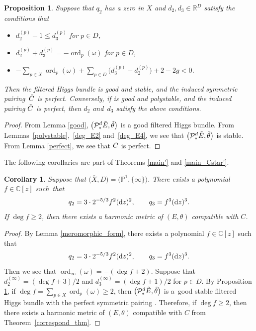 \documentclass[pdftex]{sigma}
\numberwithin{equation}{section}
\newtheorem{Corollary}[Theorem]{Corollary}
\newtheorem{Proposition}[Theorem]{Proposition}
 { \theoremstyle{definition}
\newtheorem{Definition}[Theorem]{Definition}
\newtheorem{Note}[Theorem]{Note}
\newtheorem{Example}[Theorem]{Example}
\newtheorem{Remark}[Theorem]{Remark}

\newtheorem{Question}[Theorem]{Question}
\newtheorem{Assumption}[Theorem]{Assumption}}
\newcommand{\C}{\mathbb{C}}
\newcommand{\R}{\mathbb{R}}
\newcommand{\ps}{\mathbb{P}}
\newcommand{\ord}{\operatorname{ord}}
\begin{document}
\begin{Proposition}\label{main_prop}
 Suppose that $q_2$ has a zero in $X$ and $d_2, d_3\in \R^D$ satisfy the conditions that
 \begin{itemize}\itemsep=0pt
 \item $d^{(p)}_2-1\leq d^{(p)}_3$ for $p\in D$,
 \item $d^{(p)}_2 + d^{(p)}_3 = -\ord_p(\omega)$ for $p\in D$,
 \item $-\sum_{p\in X}\ord_p(\omega) + \sum_{p\in D} \bigl(d^{(p)}_3 - d^{(p)}_2\bigr) + 2-2g <0$.
 \end{itemize}
 Then the filtered Higgs bundle  is good and stable, and the induced symmetric pairing~$\Tilde{C}$ is perfect. Conversely, if  is good and polystable, and the induced pairing $\Tilde{C}$ is perfect, then $d_2$ and~$d_3$ satisfy the above conditions.
\end{Proposition}
\begin{proof}
 From Lemma \ref{good}, $\bigl(\mathcal{P}^d_{*}{\Tilde{E}},\Tilde{\theta}\bigr)$ is a good filtered Higgs bundle.
 From Lemmas~\ref{polystable},~\ref{deg_E2} and~\ref{deg_E4}, we see that $\bigl(\mathcal{P}^d_{*}{\Tilde{E}},\Tilde{\theta}\bigr)$ is stable. From Lemma \ref{perfect}, we see that $\Tilde{C}$ is perfect.
\end{proof}

The following corollaries are part of Theorems \ref{main'} and \ref{main_Cstar'}.
\begin{Corollary}\label{main_cor}
 Suppose that $\bigl(\overline{X},D\bigr)=\bigl(\ps^1,\{\infty\}\bigr)$. There exists a polynomial $f\in \C[z]$ such~that
 \begin{equation*}
 q_2 = 3\cdot 2^{-5/3}f^2 ({\rm d}z)^2, \qquad q_3 = f^3 ({\rm d}z)^3.
 \end{equation*}
 If $\deg{f}\geq 2$, then there exists a harmonic metric of $(E,\theta)$ compatible with $C$.
\end{Corollary}
\begin{proof}
 By Lemma \ref{meromorphic_form}, there exists a polynomial $f\in \C[z]$ such that
 \begin{equation*}
 q_2 = 3\cdot 2^{-5/3}f^2 ({\rm d}z)^2, \qquad q_3 = f^3 ({\rm d}z)^3.
 \end{equation*}
 Then we see that $\ord_{\infty}(\omega) = -(\deg{f} + 2 )$.
 Suppose that $d_2^{(\infty)} = (\deg{f} + 3 )/2$ and $d_3^{(\infty)} = (\deg{f} + 1 )/2$ for $p\in D$.
 By Proposition \ref{main_prop}, if $\deg{f} = \sum_{p\in X}\ord_p(\omega) \geq 2$, then $\bigl(\mathcal{P}^d_{*}{\Tilde{E}},\Tilde{\theta}\bigr)$ is a~good stable filtered Higgs bundle with the perfect symmetric pairing . Therefore, if $\deg{f} \geq 2$, then there exists a harmonic metric of $(E,\theta)$ compatible with $C$ from Theorem~\ref{correspond_thm}.
\end{proof}
\end{document}
